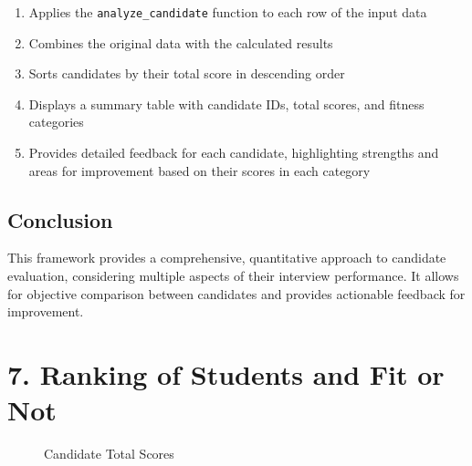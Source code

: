 \documentclass{article}
\begin{document}
\begin{enumerate}
    \item Applies the \texttt{analyze\_candidate} function to each row of the input data
    \item Combines the original data with the calculated results
    \item Sorts candidates by their total score in descending order
    \item Displays a summary table with candidate IDs, total scores, and fitness categories
    \item Provides detailed feedback for each candidate, highlighting strengths and areas for improvement based on their scores in each category
\end{enumerate}

\subsection{Conclusion}

This framework provides a comprehensive, quantitative approach to candidate evaluation, considering multiple aspects of their interview performance. It allows for objective comparison between candidates and provides actionable feedback for improvement.

\newpage

\section{7. Ranking of Students and Fit or Not}
\begin{figure}[htbp]
    \centering
    \caption{Candidate Total Scores}
    \label{fig:candidate-scores}
    \end{figure}
    
\end{document}
